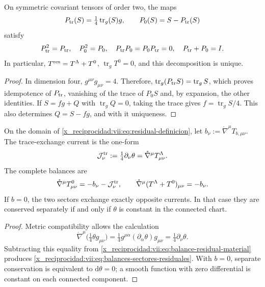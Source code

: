 \begin{proposition}
\label{x_reciprocidad:vii:prop:proyectores-traza-residual}
On symmetric covariant tensors of order two, the maps
\[
 P_{\rm tr}(S)=\tfrac14\operatorname{tr}_g(S)g,
 \qquad P_0(S)=S-P_{\rm tr}(S)
\]
satisfy
\begin{equation}
 P_{\rm tr}^2=P_{\rm tr},\quad P_0^2=P_0,\quad
 P_{\rm tr}P_0=P_0P_{\rm tr}=0,\quad P_{\rm tr}+P_0=I.
 \label{x_reciprocidad:vii:eq:proyectores-traza-residual}
\end{equation}
In particular, \(T^{\rm res}=T^\Lambda+T^0\),
\(\operatorname{tr}_gT^0=0\), and this decomposition is unique.
\end{proposition}
\begin{proof}
In dimension four, \(g^{\mu\nu}g_{\mu\nu}=4\). Therefore,
\(\operatorname{tr}_g(P_{\rm tr}S)=\operatorname{tr}_gS\), which
proves idempotence of \(P_{\rm tr}\), vanishing of the trace
of \(P_0S\) and, by expansion, the other identities.
If \(S=fg+Q\) with \(\operatorname{tr}_gQ=0\), taking the trace
gives \(f=\operatorname{tr}_gS/4\). This also determines
\(Q=S-fg\), and with it uniqueness.
\end{proof}

\begin{theorem}
\label{x_reciprocidad:vii:thm:intercambio-traza-residual}
On the domain of \eqref{x_reciprocidad:vii:eq:residual-definicion}, let
\(b_\nu:=\mathring\nabla^\mu T_{b,\mu\nu}\). The trace-exchange
current is the one-form
\begin{equation}
 \mathcal J^{\rm tr}_\nu
 :=\tfrac14\partial_\nu\theta
 =\mathring\nabla^\mu T^\Lambda_{\mu\nu}.
 \label{x_reciprocidad:vii:eq:corriente-intercambio-traza}
\end{equation}
The complete balances are
\begin{equation}
 \mathring\nabla^\mu T^0_{\mu\nu}
       =-b_\nu-\mathcal J^{\rm tr}_\nu,
 \qquad
 \mathring\nabla^\mu(T^\Lambda+T^0)_{\mu\nu}=-b_\nu.
 \label{x_reciprocidad:vii:eq:balances-sectores-residuales}
\end{equation}
If \(b=0\), the two sectors exchange exactly opposite currents.
In that case they are conserved separately if and only if \(\theta\) is
constant in the connected chart.
\end{theorem}
\begin{proof}
Metric compatibility allows the calculation
\[
 \mathring\nabla^\mu\bigl(\tfrac14\theta g_{\mu\nu}\bigr)
 =\tfrac14g^{\mu\alpha}(\partial_\alpha\theta)g_{\mu\nu}
 =\tfrac14\partial_\nu\theta.
\]
Subtracting this equality from \eqref{x_reciprocidad:vii:eq:balance-residual-material} produces
\eqref{x_reciprocidad:vii:eq:balances-sectores-residuales}. With \(b=0\), separate
conservation is equivalent to \(\mathrm d\theta=0\); a smooth
function with zero differential is constant on each connected component.
\end{proof}

